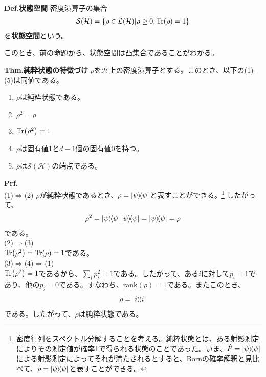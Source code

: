\documentclass[a4paper,11pt]{jsarticle}
\numberwithin{equation}{section}
\begin{document}
\begin{itembox}[l]{\textbf{Def.状態空間}}
    密度演算子の集合
    \begin{align}
        \mathcal{S}(\mathcal{H}) = \{ \rho \in \mathcal{L}(\mathcal{H}) | \rho \geq 0, \Tr(\rho) = 1 \}
    \end{align}
    を\textbf{状態空間}という。
\end{itembox}
このとき、前の命題から、状態空間は凸集合であることがわかる。\\

\begin{itembox}[l]{\textbf{Thm.純粋状態の特徴づけ}}
    $\rho$を$\mathcal{H}$上の密度演算子とする。このとき、以下の(1)-(5)は同値である。
    \begin{enumerate}
        \item $\rho$は純粋状態である。
        \item $\rho^2 = \rho$
        \item $\Tr(\rho^2) = 1$
        \item $\rho$は固有値1と$d-1$個の固有値0を持つ。
        \item $\rho$は$\mathcal{S}(\mathcal{H})$の端点である。
    \end{enumerate}
\end{itembox}
\textbf{Prf.}\\
(1)$\Rightarrow$(2)
$\rho$が純粋状態であるとき、$\rho = \ketbra{\psi}{\psi}$と表すことができる。\footnote{密度行列をスペクトル分解することを考える。純粋状態とは、ある射影測定によりその測定値が確率1で得られる状態のことであった。いま、$\hat{P}= \ketbra{\psi}{\psi}$による射影測定によってそれが満たされるとすると、Bornの確率解釈と見比べて、$\rho = \ketbra{\psi}{\psi}$と表すことができる。}
したがって、
\begin{align}
    \rho^2 = \ketbra{\psi}{\psi}\ketbra{\psi}{\psi} = \ketbra{\psi}{\psi} = \rho
\end{align}
である。\\
(2)$\Rightarrow$(3)\\
$\Tr(\rho^2) = \Tr(\rho) = 1$である。\\
(3)$\Rightarrow$(4)$\Rightarrow$(1)\\
$\Tr(\rho^2) = 1$であるから、$\sum_i p_i^2 = 1$である。したがって、ある$i$に対して$p_i = 1$であり、他の$p_j = 0$である。すなわち、rank$(\rho) = 1$である。またこのとき、
\begin{align}
    \rho = \ketbra{i}{i}
\end{align}
である。したがって、$\rho$は純粋状態である。\\
\end{document}
